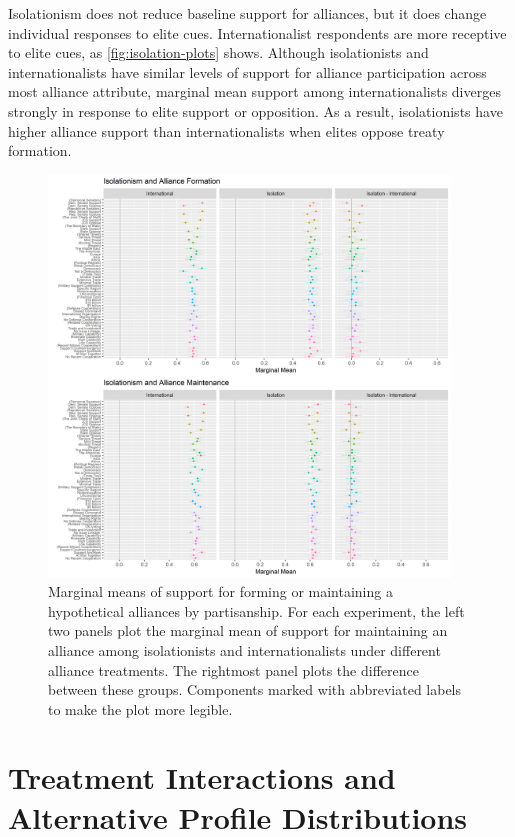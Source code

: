 \documentclass[12pt]{article}
\begin{document}
Isolationism does not reduce baseline support for alliances, but it does change individual responses to elite cues. 
Internationalist respondents are more receptive to elite cues, as \autoref{fig:isolation-plots} shows. 
Although isolationists and internationalists have similar levels of support for alliance participation across most alliance attribute, marginal mean support among internationalists diverges strongly in response to elite support or opposition. 
As a result, isolationists have higher alliance support than internationalists when elites oppose treaty formation. 


\begin{figure}
	\centering
		\includegraphics[width=0.95\textwidth]{isolation-plots.png}
	\caption{Marginal means of support for forming or maintaining a hypothetical alliances by partisanship. For each experiment, the left two panels plot the marginal mean of support for maintaining an alliance among isolationists and internationalists under different alliance treatments. The rightmost panel plots the difference between these groups. Components marked with abbreviated labels to make the plot more legible.}
	\label{fig:isolation-plots}
\end{figure}


\section{Treatment Interactions and Alternative Profile Distributions}
\end{document}
